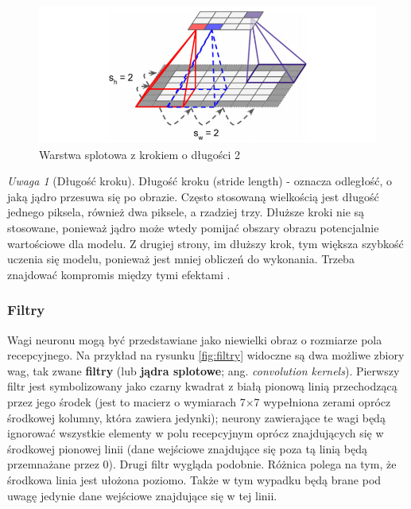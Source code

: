 \documentclass[12pt]{mwbk}
\theoremstyle{plain}
\theoremstyle{definition}
\theoremstyle{remark}
\newtheorem{uwaga}{Uwaga}[chapter]
\newcommand\zrodlo[1]{\par\vspace{-3mm}{\small\textit{Źródło: }#1 }}
\begin{document}
\begin{figure}[!h]
	\centering
	\includegraphics[width=0.9\linewidth]{rys/cnn_stride.png}
	\caption{Warstwa splotowa z krokiem o długości 2}
	\zrodlo{\cite{geron}}
	\label{fig:stride}
\end{figure}

\begin{uwaga}[Długość kroku]
	Długość kroku (stride length) - oznacza odległość, o jaką jądro przesuwa się po obrazie. Często stosowaną wielkością jest długość jednego piksela, również dwa piksele, a rzadziej trzy. Dłuższe kroki nie są stosowane, ponieważ jądro może wtedy pomijać obszary obrazu potencjalnie wartościowe dla modelu. Z drugiej strony, im dłuższy krok, tym większa szybkość uczenia się modelu, ponieważ jest mniej obliczeń do wykonania. Trzeba znajdować kompromis między tymi efektami \cite{illustrated}.
\end{uwaga}

\subsubsection{Filtry}

Wagi neuronu mogą być przedstawiane jako niewielki obraz o rozmiarze pola recepcyjnego. Na
przykład na rysunku \ref{fig:filtry} widoczne są dwa możliwe zbiory wag, tak zwane \textbf{filtry} (lub \textbf{jądra splotowe}; ang. \emph{convolution kernels}). Pierwszy filtr jest symbolizowany jako czarny kwadrat z białą pionową linią przechodzącą przez jego środek (jest to macierz o wymiarach 7×7 wypełniona zerami oprócz
środkowej kolumny, która zawiera jedynki); neurony zawierające te wagi będą ignorować wszystkie
elementy w polu recepcyjnym oprócz znajdujących się w środkowej pionowej linii (dane wejściowe
znajdujące się poza tą linią będą przemnażane przez 0). Drugi filtr wygląda podobnie. Różnica
polega na tym, że środkowa linia jest ułożona poziomo. Także w tym wypadku będą brane pod uwagę
jedynie dane wejściowe znajdujące się w tej linii.
\end{document}
